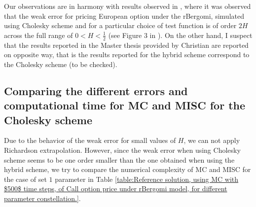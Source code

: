 \documentclass[11pt]{article}
\begin{document}
\begin{remark}
Our observations are in harmony with results observed in \cite{bayer2017regularity}, where it was observed that the weak error for pricing European option under the rBergomi, simulated using Cholesky scheme and for a particular choice of test function is of order $2H$ across the full range of $0<H <\frac{1}{2}$ (see Figure $3$ in \cite{bayer2017regularity}). On the other hand, I suspect  that the results reported in the Master thesis provided by Christian are reported on opposite way, that is the results reported for the hybrid scheme correspond to the Cholesky scheme (to be checked). 
\end{remark}


\subsection{Comparing the different  errors and computational time for MC and MISC for the Cholesky scheme}\label{sec:Comparing different  errors and complexity for MC and MISC_ Cholesky}
Due to the behavior of the weak error for small values of $H$, we can not apply Richardson extrapolation. However, since the weak error when using Cholesky scheme seems to be one order smaller than the one obtained when using the hybrid scheme, we try to compare the numerical complexity of MC and MISC for the case of set $1$ parameter in Table \ref{table:Reference solution, using MC with $500$ time steps, of Call option price under rBergomi model, for different parameter constellation.}.
\FloatBarrier
\end{document}
